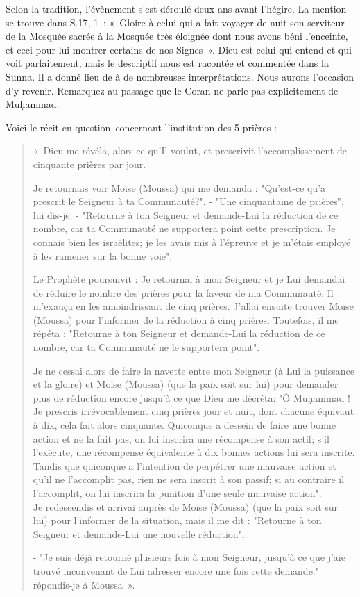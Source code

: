 Selon la tradition, l'évènement s'est déroulé deux ans avant l'hégire.
La mention se trouve dans S.17, 1~: «~Gloire à celui qui a fait voyager
de nuit son serviteur de la Mosquée sacrée à la Mosquée très éloignée
dont nous avons béni l'enceinte, et ceci pour lui montrer certains de
nos Signes~». Dieu est celui qui entend et qui voit parfaitement, mais
le descriptif nous est racontée et commentée dans la Sunna. Il a donné
lieu de à de nombreuses interprétations. Nous aurons l'occasion d'y
revenir. Remarquez au passage que le Coran ne parle pas explicitement de
Muḥammad.

Voici le récit en question~concernant l'institution des 5 prières :

\begin{quote}
«~Dieu me révéla, alors ce qu'Il voulut, et prescrivit l'accomplissement
de cinquante prières par jour.

Je retournais voir Moïse (Moussa) qui me demanda : "Qu'est-ce qu'a
prescrit le Seigneur à ta Communauté?". - "Une cinquantaine de prières",
lui dis-je. - "Retourne à ton Seigneur et demande-Lui la réduction de ce
nombre, car ta Communauté ne supportera point cette prescription. Je
connais bien les israélites; je les avais mis à l'épreuve et je m'étais
employé à les ramener sur la bonne voie".

Le Prophète poursuivit : Je retournai à mon Seigneur et je Lui demandai
de réduire le nombre des prières pour la faveur de ma Communauté. Il
m'exauça en les amoindrissant de cinq prières. J'allai ensuite trouver
Moïse (Moussa) pour l'informer de la réduction à cinq prières.
Toutefois, il me répéta : "Retourne à ton Seigneur et demande-Lui la
réduction de ce nombre, car ta Communauté ne le supportera point".

Je ne cessai alors de faire la navette entre mon Seigneur (à Lui la
puissance et la gloire) et Moïse (Moussa) (que la paix soit sur lui)
pour demander plus de réduction encore jusqu'à ce que Dieu me décréta:
"Ô Muḥammad ! Je prescris irrévocablement cinq prières jour et nuit,
dont chacune équivaut à dix, cela fait alors cinquante. Quiconque a
dessein de faire une bonne action et ne la fait pas, on lui inscrira une
récompense à son actif; s'il l'exécute, une récompense équivalente à dix
bonnes actions lui sera inscrite. Tandis que quiconque a l'intention de
perpétrer une mauvaise action et qu'il ne l'accomplit pas, rien ne sera
inscrit à son passif; si au contraire il l'accomplit, on lui inscrira la
punition d'une seule mauvaise action".\\
Je redescendis et arrivai auprès de Moïse (Moussa) (que la paix soit sur
lui) pour l'informer de la situation, mais il me dit : "Retourne à ton
Seigneur et demande-Lui une nouvelle réduction".

- "Je suis déjà retourné plusieurs fois à mon Seigneur, jusqu'à ce que
j'aie trouvé inconvenant de Lui adresser encore une fois cette demande."
répondis-je à Moussa~».
\end{quote}

